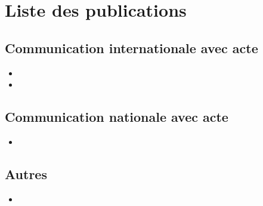 \chapter*{Liste des publications}

\section*{Communication internationale avec acte}
  \begin{itemize}
    \item {}
    \item {}
  \end{itemize}


\section*{Communication nationale avec acte}
  \begin{itemize}
    \item {}
  \end{itemize}
  
\section*{Autres}
  \begin{itemize}
    \item {}
    
  \end{itemize}
  

